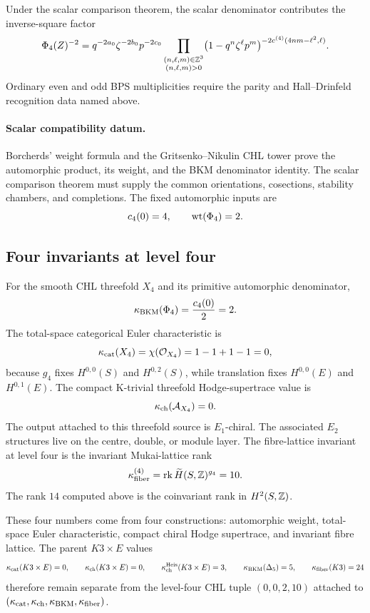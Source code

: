 Under the scalar comparison theorem, the scalar denominator contributes
the inverse-square factor
\[
  \Phi_4(Z)^{-2}
  =
  q^{-2a_0}\zeta^{-2b_0}p^{-2c_0}
  \prod_{\substack{(n,\ell,m)\in\mathbb{Z}^3\\(n,\ell,m)>0}}
  \bigl(1-q^n\zeta^\ell p^m\bigr)^{
    -2c^{(4)}(4nm-\ell^2,\ell)}.
\]
Ordinary even and odd BPS multiplicities require the parity and
Hall--Drinfeld recognition data named above.

\paragraph{Scalar compatibility datum.}
Borcherds' weight formula and the Gritsenko--Nikulin CHL tower prove
the automorphic product, its weight, and the BKM denominator identity.
The scalar comparison theorem must supply the common orientations,
cosections, stability chambers, and completions. The fixed automorphic
inputs are
\[
  c_4(0)=4,\qquad \mathrm{wt}(\Phi_4)=2.
\]

\subsection*{Four invariants at level four}

For the smooth CHL threefold $X_4$ and its primitive automorphic
denominator,
\[
  \kappa_{\mathrm{BKM}}(\Phi_4)=\frac{c_4(0)}2=2.
\]
The total-space categorical Euler characteristic is
\[
  \kappa_{\mathrm{cat}}(X_4)
  =
  \chi(\mathcal{O}_{X_4})
  =
  1-1+1-1
  =
  0,
\]
because $g_4$ fixes $H^{0,0}(S)$ and $H^{0,2}(S)$, while translation
fixes $H^{0,0}(E)$ and $H^{0,1}(E)$.
The compact K-trivial threefold Hodge-supertrace value is
\[
  \kappa_{\mathrm{ch}}(\mathcal A_{X_4})=0.
\]
The output attached to this threefold source is $E_1$-chiral. The
associated $E_2$ structures live on the centre, double, or module layer.
The fibre-lattice invariant at level four is the invariant Mukai-lattice
rank
\[
  \kappa_{\mathrm{fiber}}^{(4)}
  =
  \mathrm{rk}\,\widetilde H(S,\mathbb{Z})^{g_4}
  =
  10.
\]
The rank $14$ computed above is the coinvariant rank in $H^2(S,\mathbb{Z})$.

These four numbers come from four constructions: automorphic weight,
total-space Euler characteristic, compact chiral Hodge supertrace, and
invariant fibre lattice. The parent $K3\times E$ values
\[
  \kappa_{\mathrm{cat}}(K3\times E)=0,\qquad
  \kappa_{\mathrm{ch}}(K3\times E)=0,\qquad
  \kappa_{\mathrm{ch}}^{\mathrm{Heis}}(K3\times E)=3,\qquad
  \kappa_{\mathrm{BKM}}(\Delta_5)=5,\qquad
  \kappa_{\mathrm{fiber}}(K3)=24
\]
therefore remain separate from the level-four CHL tuple
$(0,0,2,10)$ attached to $(\kappa_{\mathrm{cat}},\kappa_{\mathrm{ch}},\kappa_{\mathrm{BKM}},\kappa_{\mathrm{fiber}})$.

